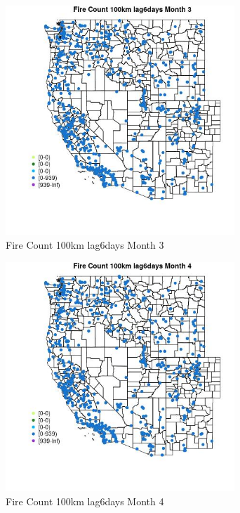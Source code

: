 \begin{figure} 
\centering  
\includegraphics[width=0.77\textwidth]{Code_Outputs/Report_ML_input_PM25_Step4_part_e_de_duplicated_aves_compiled_2019-05-21wNAs_MapObsMo3Fire_Count_100km_lag6days.jpg} 
\caption{\label{fig:Report_ML_input_PM25_Step4_part_e_de_duplicated_aves_compiled_2019-05-21wNAsMapObsMo3Fire_Count_100km_lag6days}Fire Count 100km lag6days Month 3} 
\end{figure} 
 

\begin{figure} 
\centering  
\includegraphics[width=0.77\textwidth]{Code_Outputs/Report_ML_input_PM25_Step4_part_e_de_duplicated_aves_compiled_2019-05-21wNAs_MapObsMo4Fire_Count_100km_lag6days.jpg} 
\caption{\label{fig:Report_ML_input_PM25_Step4_part_e_de_duplicated_aves_compiled_2019-05-21wNAsMapObsMo4Fire_Count_100km_lag6days}Fire Count 100km lag6days Month 4} 
\end{figure} 
 

